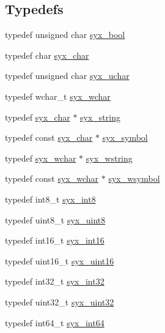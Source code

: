 \subsection*{Typedefs}
\begin{CompactItemize}
\item 
typedef unsigned char \hyperlink{syx-types_8h_c6dc09b276b99fa1956364359139daab}{syx\_\-bool}
\item 
typedef char \hyperlink{syx-types_8h_22636fad803dd674d2640c323df20a11}{syx\_\-char}
\item 
typedef unsigned char \hyperlink{syx-types_8h_fba920bf291b2a86b5a180e867d0dadf}{syx\_\-uchar}
\item 
typedef wchar\_\-t \hyperlink{syx-types_8h_a9acd2e71d424e11b9124acd0d3bae12}{syx\_\-wchar}
\item 
typedef \hyperlink{syx-types_8h_22636fad803dd674d2640c323df20a11}{syx\_\-char} $\ast$ \hyperlink{syx-types_8h_1bff1fd86072dd98849437bc9dcb35c3}{syx\_\-string}
\item 
typedef const \hyperlink{syx-types_8h_22636fad803dd674d2640c323df20a11}{syx\_\-char} $\ast$ \hyperlink{syx-types_8h_9663af54b7b72f5d8be5f754ef356525}{syx\_\-symbol}
\item 
typedef \hyperlink{syx-types_8h_a9acd2e71d424e11b9124acd0d3bae12}{syx\_\-wchar} $\ast$ \hyperlink{syx-types_8h_049e6bf08a24efd298a398b5e8c27ead}{syx\_\-wstring}
\item 
typedef const \hyperlink{syx-types_8h_a9acd2e71d424e11b9124acd0d3bae12}{syx\_\-wchar} $\ast$ \hyperlink{syx-types_8h_6fab7c0dab70ca1ee8812c0b5a6e0819}{syx\_\-wsymbol}
\item 
typedef int8\_\-t \hyperlink{syx-types_8h_8d3f27f7874e163d9fcda71e7540bdd7}{syx\_\-int8}
\item 
typedef uint8\_\-t \hyperlink{syx-types_8h_7cb1870b8124a88e807c98f315f3d923}{syx\_\-uint8}
\item 
typedef int16\_\-t \hyperlink{syx-types_8h_2d6178ce3abc15f1a0df5bbd7eb5e302}{syx\_\-int16}
\item 
typedef uint16\_\-t \hyperlink{syx-types_8h_5c0caeeeb45b4575061ab7f368f10337}{syx\_\-uint16}
\item 
typedef int32\_\-t \hyperlink{syx-types_8h_9f31c17555a2dfcf25da84b5c4a2e55b}{syx\_\-int32}
\item 
typedef uint32\_\-t \hyperlink{syx-types_8h_eb2d8221bf07737360750e4c0ec66a99}{syx\_\-uint32}
\item 
typedef int64\_\-t \hyperlink{syx-types_8h_3e43d32ed4089e8e06e1f8d9576af15c}{syx\_\-int64}

\end{CompactItemize}
